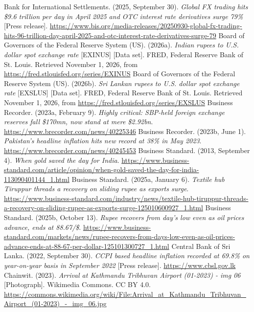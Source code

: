  Bank for International Settlements. (2025, September 30). \emph{Global FX trading hits \$9.6 trillion per day in April 2025 and OTC interest rate derivatives surge 79\%} [Press release]. \url{https://www.bis.org/media-releases/20250930-global-fx-trading-hits-96-trillion-day-april-2025-and-otc-interest-rate-derivatives-surge-79}
 Board of Governors of the Federal Reserve System (US). (2026a). \emph{Indian rupees to U.S. dollar spot exchange rate} [EXINUS] [Data set]. FRED, Federal Reserve Bank of St. Louis. Retrieved November 1, 2026, from \url{https://fred.stlouisfed.org/series/EXINUS}
 Board of Governors of the Federal Reserve System (US). (2026b). \emph{Sri Lankan rupees to U.S. dollar spot exchange rate} [EXSLUS] [Data set]. FRED, Federal Reserve Bank of St. Louis. Retrieved November 1, 2026, from \url{https://fred.stlouisfed.org/series/EXSLUS}
 Business Recorder. (2023a, February 9). \emph{Highly critical: SBP-held foreign exchange reserves fall \$170mn, now stand at mere \$2.92bn}. \url{https://www.brecorder.com/news/40225346}
 Business Recorder. (2023b, June 1). \emph{Pakistan's headline inflation hits new record at 38\% in May 2023}. \url{https://www.brecorder.com/news/40245453}
 Business Standard. (2013, September 4). \emph{When gold saved the day for India}. \url{https://www.business-standard.com/article/opinion/when-gold-saved-the-day-for-india-113090401144_1.html}
 Business Standard. (2025a, January 6). \emph{Textile hub Tiruppur threads a recovery on sliding rupee as exports surge}. \url{https://www.business-standard.com/industry/news/textile-hub-tiruppur-threads-a-recovery-on-sliding-rupee-as-exports-surge-125010600927_1.html}
 Business Standard. (2025b, October 13). \emph{Rupee recovers from day’s low even as oil prices advance, ends at 88.67/\$}. \url{https://www.business-standard.com/markets/news/rupee-recovers-from-days-low-even-as-oil-prices-advance-ends-at-88-67-per-dollar-125101300727_1.html}
 Central Bank of Sri Lanka. (2022, September 30). \emph{CCPI based headline inflation recorded at 69.8\% on year-on-year basis in September 2022} [Press release]. \url{https://www.cbsl.gov.lk}
 Chainwit. (2023). \emph{Arrival at Kathmandu Tribhuvan Airport (01-2023) - img 06} [Photograph]. Wikimedia Commons. CC BY 4.0. \url{https://commons.wikimedia.org/wiki/File:Arrival_at_Kathmandu_Tribhuvan_Airport_(01-2023)_-_img_06.jpg}
